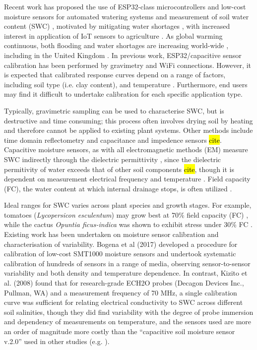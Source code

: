 \documentclass[11pt]{article}
\begin{document}
Recent work has proposed the use of ESP32-class microcontrollers and low-cost moisture sensors for automated watering systems and measurement of soil water content (SWC) \cite{biswas2018-solar-pump, purnomo2021-lora, sudarmaji2024-smart-soil, afzal2025-arima}, motivated by mitigating water shortages \cite{afzal2025-arima}, with increased interest in application of IoT sensors to agriculture \cite{ruiz2025-iot-mapping}. As global warming continuous, both flooding and water shortages are increasing world-wide \cite{ficklin2022hydrological}, including in the United Kingdom \cite{lane2021climate}. In previous work, ESP32/capacitive sensor calibration has been performed by gravimetry \cite{sudarmaji2024-smart-soil} and WiFi connections. However, it is expected that calibrated response curves depend on a range of factors, including soil type (i.e. clay content), and temperature \cite{merlin2007-calibration}. Furthermore, end users may find it difficult to undertake calibration for each specific application type. 

Typically, gravimetric sampling can be used to characterise SWC, but is destructive and time consuming; this process often involves drying soil by heating and therefore cannot be applied to existing plant systems. Other methods include time domain reflectometry and capacitance and impedence sensors \hl{cite}. Capacitive moisture sensors, as with all electromagnetic methods (EM) measure SWC indirectly through the dielectric permittivity \cite{kelleners2005-frequency-dependence}, since the dielectric permitivity of water exceeds that of other soil components \hl{cite}, though it is dependent on measurement electrical frequency \cite{kelleners2005-frequency-dependence,sheng2025-frequency} and temperature \cite{jones2005-em-methodology}. Field capacity (FC), the water content at which internal drainage stops, is often utilized \cite{jury2004soil}. 

Ideal ranges for SWC varies across plant species and growth stages. For example, tomatoes (\textit{Lycopersicon esculentum}) may grow best at 70\% field capacity (FC) \cite{liu2019tomato}, while the cactus \textit{Opuntia ficus-indica} was shown to exhibit stress under 30\% FC \cite{lahbouki2023effects}.\\

Existing work has been undertaken on moisture sensor calibration and characterisation of variability. Bogena et al (2017) \cite{bogena2017-calibration} developed a procedure for calibration of low-cost SMT1000 moisture sensors and undertook systematic calibration of hundreds of sensors in a range of media, observing sensor-to-sensor variability and both density and temperature dependence. In contrast, Kizito et al. (2008) \cite{kizito2008-frequency} found that for research-grade ECH2O probes (Decagon Devices Inc., Pullman, WA) and a measurement frequency of 70 MHz, a single calibration curve was sufficient for relating electrical conductivity to SWC across different soil salinities, though they did find variability with the degree of probe immersion and dependency of measurements on temperature, and the sensors used are more an order of magnitude more costly than the ``capacitive soil moisture sensor v.2.0'' used in other studies (e.g. \cite{sudarmaji2024-smart-soil}). 
\end{document}
